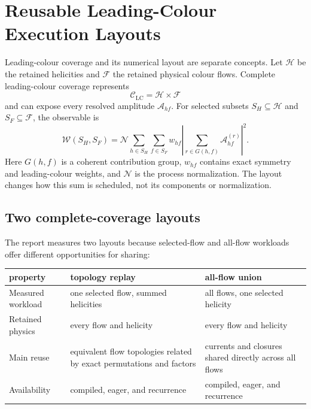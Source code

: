 \section{Reusable Leading-Colour Execution Layouts}
\label{sec:lc-flow-layouts}

Leading-colour coverage and its numerical layout are separate concepts.  Let
\(\mathcal H\) be the retained helicities and \(\mathcal F\) the retained
physical colour flows.  Complete leading-colour coverage represents
\begin{equation}
  \mathcal C_{\mathrm{LC}}=\mathcal H\times\mathcal F
  \label{eq:lc-complete-coverage}
\end{equation}
and can expose every resolved amplitude \(\mathcal A_{hf}\).  For selected
subsets \(S_H\subseteq\mathcal H\) and \(S_F\subseteq\mathcal F\), the
observable is
\begin{equation}
  \mathcal W(S_H,S_F)
  =\mathcal N\sum_{h\in S_H}\sum_{f\in S_F}w_{hf}
   \left|\sum_{r\in G(h,f)}\mathcal A^{(r)}_{hf}\right|^2 .
  \label{eq:lc-runtime-selection}
\end{equation}
Here \(G(h,f)\) is a coherent contribution group, \(w_{hf}\) contains exact
symmetry and leading-colour weights, and \(\mathcal N\) is the process
normalization.  The layout changes how this sum is scheduled, not its
components or normalization.

\subsection{Two complete-coverage layouts}

The report measures two layouts because selected-flow and all-flow workloads
offer different opportunities for sharing:

\begin{center}
\small
\begin{tabular}{@{}L{1.32in}L{2.40in}L{2.40in}@{}}
\toprule
\textbf{property} & \textbf{topology replay} &
  \textbf{all-flow union} \\
\midrule
Measured workload & one selected flow, summed helicities &
  all flows, one selected helicity \\
Retained physics & every flow and helicity &
  every flow and helicity \\
Main reuse & equivalent flow topologies related by exact permutations and
  factors & currents and closures shared directly across all flows \\
Availability & compiled, eager, and recurrence &
  compiled, eager, and recurrence \\
\bottomrule
\end{tabular}
\end{center}

